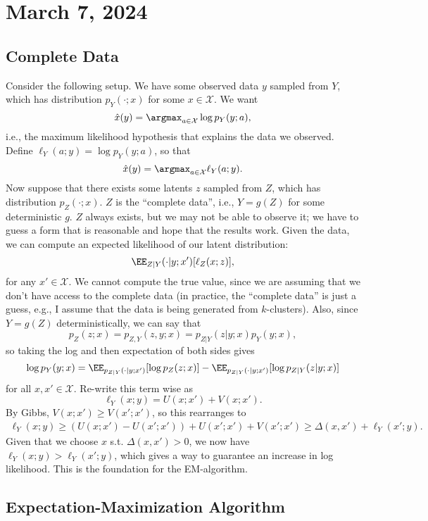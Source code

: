 \section{March 7, 2024}

\subsection{Complete Data}

Consider the following setup. We have some observed data $y$ sampled from $Y$, which has distribution $p_Y(\cdot; x)$ for some $x\in \mathcal{X}$. We want 
\[\hat{x}(y) = \argmax_{a\in \mathcal{X}}\log p_Y(y; a),\] 
i.e., the maximum likelihood hypothesis that explains the data we observed. Define $\ell_Y(a;y) = \log p_Y(y;a)$, so that
\[\hat{x}(y) = \argmax_{a\in \mathcal{X}}\ell_Y(a; y). \] 
Now suppose that there exists some latents $z$ sampled from $Z$, which has distribution $p_Z(\cdot; x)$. $Z$ is the ``complete data'', i.e., $Y = g(Z)$ for some deterministic $g$. $Z$ always exists, but we may not be able to observe it; we have to guess a form that is reasonable and hope that the results work. Given the data, we can compute an expected likelihood of our latent distribution: 
\[\EE_{Z|Y}(\cdot | y; x')[\ell_Z(x; z)],\]
for any $x'\in \mathcal{X}$. We cannot compute the true value, since we are assuming that we don't have access to the complete data (in practice, the ``complete data'' is just a guess, e.g., I assume that the data is being generated from $k$-clusters). Also, since $Y=g(Z)$ deterministically, we can say that 
\[p_Z(z;x) = p_{Z,Y}(z,y;x) = p_{Z|Y}(z|y;x)p_Y(y;x),\]
so taking the log and then expectation of both sides gives 
\[\log p_Y(y;x) = \EE_{p_{Z|Y}(\cdot | y; x')}[\log p_Z(z;x)] - \EE_{p_{Z|Y}(\cdot | y; x')}[\log p_{Z|Y}(z|y; x)]\] 
for all $x,x'\in \mathcal{X}$. Re-write this term wise as 
\[\ell_Y(x;y) = U(x;x') + V(x;x').\] 
By Gibbs, $V(x;x')\geq V(x';x')$, so this rearranges to 
\begin{align*}
\ell_Y(x;y)\geq (U(x;x')-U(x';x')) + U(x';x')+V(x';x') \geq \Delta(x,x') + \ell_Y(x';y).
\end{align*} 
Given that we choose $x$ s.t. $\Delta(x,x') > 0$, we now have $\ell_Y(x;y) > \ell_Y(x';y)$, which gives a way to guarantee an increase in log likelihood. This is the foundation for the EM-algorithm.

\subsection{Expectation-Maximization Algorithm}

